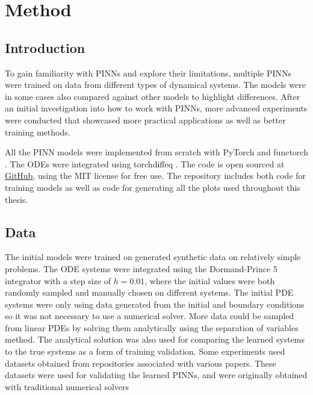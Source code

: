 \chapter{Method} \label{cpt:method}

\section{Introduction}

To gain familiarity with PINNs and explore their limitations, multiple PINNs were trained on data from different types of dynamical systems. The models were in some cases also compared against other models to highlight differences. After an initial investigation into how to work with PINNs, more advanced experiments were conducted that showcased more practical applications as well as better training methods.

All the PINN models were implemented from scratch with PyTorch \cite{pytorch} and functorch \cite{functorch}. The ODEs were integrated using torchdiffeq \cite{torchdiffeq}. The code is open sourced at \href{https://github.com/aljhn/master_project2}{{GitHub}}, using the MIT license for free use. The repository includes both code for training models as well as code for generating all the plots used throughout this thesis.

\section{Data}

The initial models were trained on generated synthetic data on relatively simple problems. The ODE systems were integrated using the Dormand-Prince 5 \cite{dopri} integrator with a step size of $h = 0.01$, where the initial values were both randomly sampled and manually chosen on different systems. The initial PDE systems were only using data generated from the initial and boundary conditions so it was not necessary to use a numerical solver. More data could be sampled from linear PDEs by solving them analytically using the separation of variables method. The analytical solution was also used for comparing the learned systems to the true systems as a form of training validation. Some experiments used datasets obtained from repositories associated with various papers. These datasets were used for validating the learned PINNs, and were originally obtained with traditional numerical solvers

